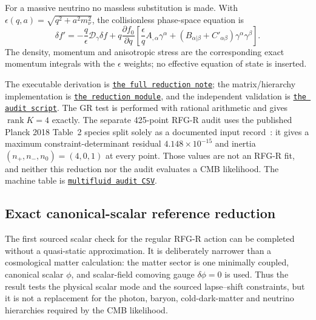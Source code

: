 \documentclass[11pt,a4paper]{article}
\newcommand{\RFGRepoURL}{https://github.com/MartinPetrasek123/MartinPetrasek123}
\newcommand{\RFGRepoNamed}[2]{\href{\RFGRepoURL/blob/main/r-universe-complete-chain/rfg-r-completion/r\_universe\_completion/#1}{\texttt{#2}}}
\begin{document}
For a massive neutrino no massless substitution is made.  With
\(\epsilon(q,a)=\sqrt{q^2+a^2m_\nu^2}\), the collisionless phase-space
equation is
\begin{equation}
 \delta f'=-\frac{q}{\epsilon}\mathcal D_\gamma\delta f
 +q\frac{\partial f_0}{\partial q}
 \left[\frac{\epsilon}{q}A_{,\alpha}\gamma^\alpha
 +(B_{\alpha|\beta}+C'_{\alpha\beta})\gamma^\alpha\gamma^\beta\right].
 \label{eq:RFGR-massive-neutrino}
\end{equation}
The density, momentum and anisotropic stress are the corresponding exact
momentum integrals with the \(\epsilon\) weights; no effective equation of
state is inserted.

The executable derivation is
\RFGRepoNamed{docs/photon\_baryon\_cdm\_neutrino\_reduction.md}{the full reduction note};
the matrix/hierarchy implementation is
\RFGRepoNamed{scripts/multifluid\_reduction.py}{the reduction module}, and
the independent validation is
\RFGRepoNamed{scripts/validate\_multifluid\_reduction.py}{the audit script}.
The GR test is performed with rational arithmetic and gives
\(\operatorname{rank}K=4\) exactly.  The separate 425-point RFG-R audit uses
the published Planck 2018 Table~2 species split solely as a documented input
record~\cite{Planck}: it gives a maximum constraint-determinant residual
\(4.148\times10^{-15}\) and inertia
\((n_+,n_-,n_0)=(4,0,1)\) at every point.  Those values are not an RFG-R fit,
and neither this reduction nor the audit evaluates a CMB likelihood.  The
machine table is
\RFGRepoNamed{generated/tables/multifluid\_core\_audit.csv}{multifluid audit CSV}.

\subsection{Exact canonical-scalar reference reduction}
\label{sec:rfgr-canonical-scalar}

The first sourced scalar check for the regular RFG-R action can be completed
without a quasi-static approximation.  It is deliberately narrower than a
cosmological matter calculation: the matter sector is one minimally coupled,
canonical scalar \(\phi\), and scalar-field comoving gauge
\(\delta\phi=0\) is used.  Thus the result tests the physical scalar mode
and the sourced lapse--shift constraints, but it is not a replacement for the
photon, baryon, cold-dark-matter and neutrino hierarchies required by the CMB
likelihood.
\end{document}
